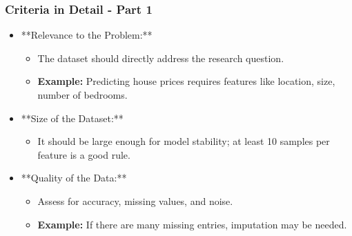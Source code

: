 \documentclass[aspectratio=169]{beamer}
\begin{document}
\begin{frame}[fragile]
    \frametitle{Criteria in Detail - Part 1}
    
    \begin{itemize}
        \item **Relevance to the Problem:**
            \begin{itemize}
                \item The dataset should directly address the research question.
                \item \textbf{Example:} Predicting house prices requires features like location, size, number of bedrooms.
            \end{itemize}
        
        \item **Size of the Dataset:**
            \begin{itemize}
                \item It should be large enough for model stability; at least 10 samples per feature is a good rule.
            \end{itemize}
        
        \item **Quality of the Data:**
            \begin{itemize}
                \item Assess for accuracy, missing values, and noise.
                \item \textbf{Example:} If there are many missing entries, imputation may be needed.
            \end{itemize}
    \end{itemize}
\end{frame}
\end{document}

